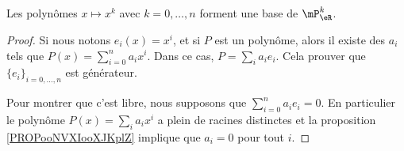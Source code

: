 \begin{proposition}	\label{PROPooWOMFooLpTKgG}
	Les polynômes \( x\mapsto x^k\) avec \( k=0,\ldots,n\) forment une base de \( \mP_{\eR}^k\).
\end{proposition}

\begin{proof}
	Si nous notons \( e_i(x)=x^i\), et si \( P\) est un polynôme, alors il existe des \( a_i\) tels que \( P(x)=\sum_{i=0}^na_ix^i\). Dans ce cas, \( P=\sum_ia_ie_i\). Cela prouver que \( \{ e_i \}_{i=0,\ldots,n}\) est générateur.

	Pour montrer que c'est libre, nous supposons que \( \sum_{i=0}^na_ie_i=0\). En particulier le polynôme \( P(x)=\sum_ia_ix^i\) a plein de racines distinctes et la proposition \ref{PROPooNVXIooXJKplZ} implique que \( a_i=0\) pour tout \( i\).
\end{proof}


